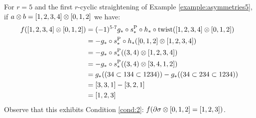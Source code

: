 \begin{example}\label{example:f5_2}
	For $r=5$ and the first $r$-cyclic straightening of Example \ref{example:asymmetries5}, if $a \otimes b = [1,2,3,4] \otimes [0,1,2]$ we have:
	\begin{align*}
		f([1,2,3,4] \otimes [0,1,2])
		&= (-1)^{5\cdot 7}g_*\circ s_*^{\operatorname{P}}\circ h_*\circ \operatorname{twist}([1,2,3,4] \otimes [0,1,2])
		\\
		&= -g_*\circ s_*^{\operatorname{P}}\circ h_*([0,1,2] \otimes [1,2,3,4])
		\\
		&= -g_*\circ s_*^{\operatorname{P}}((3,4) \otimes [1,2,3,4])
		\\
		&= -g_*\circ s_*^{\operatorname{P}}((3,4) \otimes [3,4,1,2])
		\\
		&= g_*((34 \subset 134 \subset 1234)) - g_*((34 \subset 234 \subset 1234))
		\\
		&= [3,3,1] - [3,2,1]
		\\
		&= [1,2,3]
	\end{align*}
	Observe that this exhibits Condition \eqref{cond:2}: $f(\partial\sigma \otimes [0,1,2] = [1,2,3])$.
\end{example}

